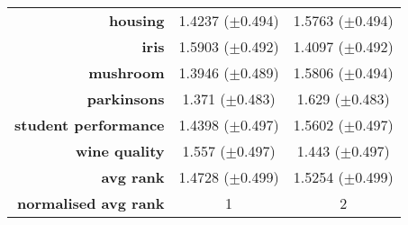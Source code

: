 \begin{table}[htb]
{\begin{tabular}{rcc}
			\multicolumn{1}{r|}{\textbf{housing}}             & \cellcolor[rgb]{ .388,  .745,  .482}1.4237 ($\pm$0.494)        & \cellcolor[rgb]{ .973,  .412,  .42}1.5763 ($\pm$0.494)  \\
			\multicolumn{1}{r|}{\textbf{iris}}                & \cellcolor[rgb]{ .973,  .412,  .42}1.5903 ($\pm$0.492)         & \cellcolor[rgb]{ .388,  .745,  .482}1.4097 ($\pm$0.492) \\
			\multicolumn{1}{r|}{\textbf{mushroom}}            & \cellcolor[rgb]{ .388,  .745,  .482}1.3946 ($\pm$0.489)        & \cellcolor[rgb]{ .973,  .412,  .42}1.5806 ($\pm$0.494)  \\
			\multicolumn{1}{r|}{\textbf{parkinsons}}          & \cellcolor[rgb]{ .388,  .745,  .482}1.371 ($\pm$0.483)         & \cellcolor[rgb]{ .973,  .412,  .42}1.629 ($\pm$0.483)   \\
			\multicolumn{1}{r|}{\textbf{student performance}} & \cellcolor[rgb]{ .388,  .745,  .482}1.4398 ($\pm$0.497)        & \cellcolor[rgb]{ .973,  .412,  .42}1.5602 ($\pm$0.497)  \\
			\multicolumn{1}{r|}{\textbf{wine quality}}        & \cellcolor[rgb]{ .973,  .412,  .42}1.557 ($\pm$0.497)          & \cellcolor[rgb]{ .388,  .745,  .482}1.443 ($\pm$0.497)  \\
			\midrule
			\multicolumn{1}{r|}{\textbf{avg rank}}            & \cellcolor[rgb]{ .388,  .745,  .482}1.4728 ($\pm$0.499)        & \cellcolor[rgb]{ .973,  .412,  .42}1.5254 ($\pm$0.499)  \\
			\midrule
			\textbf{normalised avg rank}                      & \cellcolor[rgb]{ .388,  .745,  .482}1                          & \cellcolor[rgb]{ .973,  .412,  .42}2                    \\
		\end{tabular}%

	}
\end{table}%

